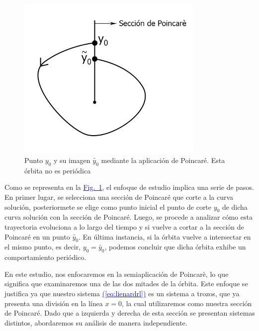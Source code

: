 \documentclass[12pt,a4paper]{report} %
\newcommand{\fref}[1]{\hyperref[#1]{\textcolor{blue}{Fig.~\ref*{#1}}}}
\newcommand{\eref}[1]{\hyperref[#1]{\textcolor{blue}{(\ref*{#1})}}}
\newcommand{\fref}[1]{\hyperref[#1]{\textcolor{blue}{\textit{Fig.~\ref*{#1}}}}}
\newcommand{\eref}[1]{\hyperref[#1]{\textcolor{blue}{\textit{(\ref*{#1})}}}}
\begin{document}
	\begin{figure}[h]
		\centering
		\includegraphics[width=0.8\textwidth]{aplipoincare2.jpg}
		\caption{Punto $y_0$ y su imagen $\tilde{y_0}$ mediante la aplicación de Poincaré. Esta órbita no es periódica}
		\label{fig:aplipoincare2}
	\end{figure}\smallskip

\noindent Como se representa en la \fref{fig:aplipoincare2}, el enfoque de estudio implica una serie de pasos. En primer lugar, se selecciona una sección de Poincaré que corte a la curva solución, posteriormete se elige como punto inicial el punto de corte $y_0$ de dicha curva solución con la sección de Poincaré. Luego, se procede a analizar cómo esta trayectoria evoluciona a lo largo del tiempo y si vuelve a cortar a la sección de Poincaré en un punto $\tilde{y_0}$. En última instancia, si la órbita vuelve a intersectar en el mismo punto, es decir, $y_0=\tilde{y_0}$, podemos concluir que dicha órbita exhibe un comportamiento periódico.

	\newpage
	
	En este estudio, nos enfocaremos en la semiaplicación de Poincarè, lo que significa que examinaremos una de las dos mitades de la órbita. Este enfoque se justifica ya que nuestro sistema \eref{eq:lienardrl} es un sistema a trozos, que ya presenta una división en la línea $x=0$, la cual utilizaremos como nuestra sección de Poincaré. Dado que a izquierda y derecha de esta sección se presentan sistemas distintos, abordaremos su análisis de manera independiente.
	
\end{document}
